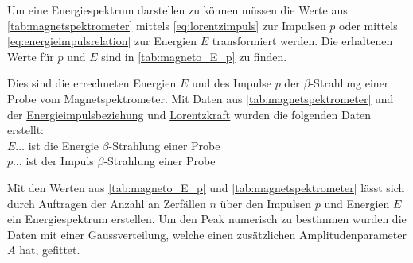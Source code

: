 \documentclass[12pt,english,ngerman]{scrartcl}
\begin{document}
Um eine Energiespektrum darstellen zu können müssen die Werte aus
\autoref{tab:magnetspektrometer} mittels \autoref{eq:lorentzimpuls} zur
Impulsen $p$ oder mittels \autoref{eq:energieimpulsrelation} zur Energien $E$
transformiert werden. Die erhaltenen Werte für $p$ und $E$ sind in
\autoref{tab:magneto_E_p} zu finden.

\begin{table}[H]
  \caption[Energie- und Impulswerte der $\beta$-Strahlung einer  Probe]{Dies sind
    die errechneten Energien $E$ und des Impulse $p$ der $\beta$-Strahlung einer
     Probe vom Magnetspektrometer. Mit Daten aus
    \autoref{tab:magnetspektrometer} und der
    \hyperref[eq:energieimpulsrelation]{Energieimpulsbeziehung} und
    \hyperref[eq:lorentzimpuls]{Lorentzkraft} wurden die folgenden Daten
    erstellt:\\
    $E \dots$ ist die Energie $\beta$-Strahlung einer  Probe\\
    $p \dots$ ist der Impuls $\beta$-Strahlung einer  Probe\\
}
  \label{tab:magneto_E_p}
  \centering
  
\end{table}

Mit den Werten aus \autoref{tab:magneto_E_p} und
\autoref{tab:magnetspektrometer} lässt sich durch Auftragen der Anzahl an
Zerfällen $n$ über den Impulsen $p$ und Energien $E$ ein Energiespektrum
erstellen. Um den Peak numerisch zu bestimmen wurden die Daten mit einer
Gaussverteilung, welche einen zusätzlichen Amplitudenparameter $A$ hat,
gefittet.
\end{document}
